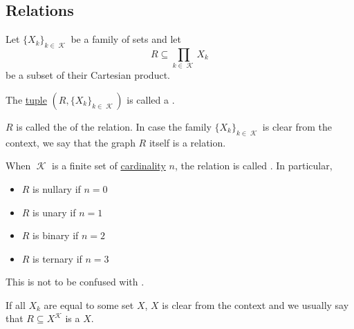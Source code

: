 \subsection{Relations}\label{subsec:relations}

\begin{definition}\label{def:relation}
  Let \( \{ X_k \}_{k \in \mscrK} \) be a family of sets and let
  \begin{equation*}
    R \subseteq \prod_{k \in \mscrK} X_k
  \end{equation*}
  be a subset of their Cartesian product.

  The \hyperref[def:cartesian_product]{tuple} \( (R,  \{ X_k \}_{k \in \mscrK}) \) is called a .

  \begin{defenum}
     \( R \) is called the  of the relation. In case the family \( \{ X_k \}_{k \in \mscrK} \) is clear from the context, we say that the graph \( R \) itself is a relation.

     When \( \mscrK \) is a finite set of \hyperref[rem:cardinals]{cardinality} \( n \), the relation is called . In particular,
    \begin{itemize}
      \item \( R \) is nullary if \( n = 0 \)
      \item \( R \) is unary if \( n = 1 \)
      \item \( R \) is binary if \( n = 2 \)
      \item \( R \) is ternary if \( n = 3 \)
    \end{itemize}

    This is not to be confused with .

     If all \( X_k \) are equal to some set \( X \), \( X \) is clear from the context and we usually say that \( R \subseteq X^{\mscrK} \) is a  \( X \).
  \end{defenum}
\end{definition}

